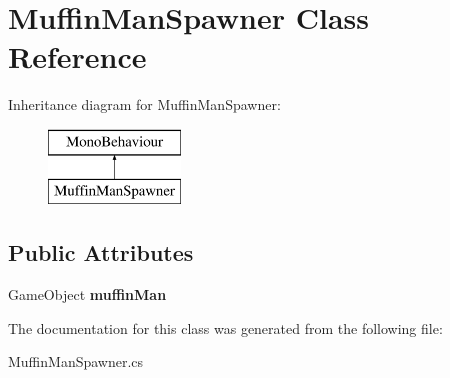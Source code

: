 \hypertarget{class_muffin_man_spawner}{}\section{Muffin\+Man\+Spawner Class Reference}
\label{class_muffin_man_spawner}
Inheritance diagram for Muffin\+Man\+Spawner\+:\begin{figure}[H]
\begin{center}
\leavevmode
\includegraphics[height=2.000000cm]{class_muffin_man_spawner}
\end{center}
\end{figure}
\subsection*{Public Attributes}
\begin{DoxyCompactItemize}
\item 
\mbox{\label{class_muffin_man_spawner_a0defd165e01bdccf49940226a98f1985}} 
Game\+Object {\bfseries muffin\+Man}
\end{DoxyCompactItemize}


The documentation for this class was generated from the following file\+:\begin{DoxyCompactItemize}
\item 
Muffin\+Man\+Spawner.\+cs\end{DoxyCompactItemize}
